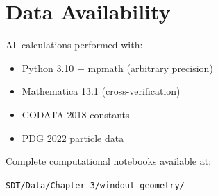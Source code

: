 \documentclass{article}
\begin{document}
\section{Data Availability}

All calculations performed with:
\begin{itemize}
\item Python 3.10 + mpmath (arbitrary precision)
\item Mathematica 13.1 (cross-verification)
\item CODATA 2018 constants
\item PDG 2022 particle data
\end{itemize}

Complete computational notebooks available at:

\texttt{SDT/Data/Chapter\_3/windout\_geometry/}
\end{document}
